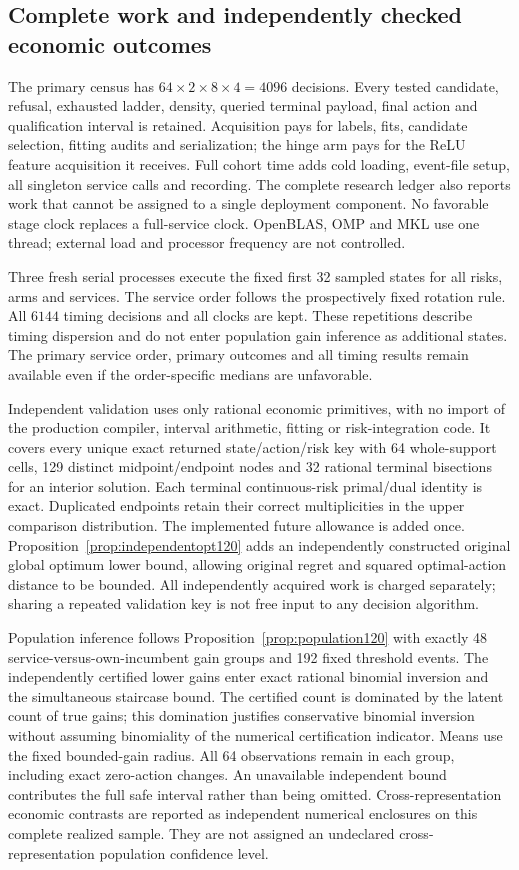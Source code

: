 \subsection{Complete work and independently checked economic outcomes}
The primary census has $64\times2\times8\times4=4096$ decisions.
Every tested candidate, refusal, exhausted ladder, density, queried terminal
payload, final action and qualification interval is retained. Acquisition pays
for labels, fits, candidate selection, fitting audits and serialization; the
hinge arm pays for the ReLU feature acquisition it receives. Full cohort time
adds cold loading, event-file setup, all singleton service calls and recording.
The complete research ledger also reports work that cannot be assigned to a
single deployment component. No favorable stage clock replaces a full-service
clock. OpenBLAS, OMP and MKL use one thread; external load and processor frequency
are not controlled.

Three fresh serial processes execute the fixed first 32 sampled states for
all risks, arms and services. The service order follows the prospectively fixed
rotation rule. All $6144$ timing decisions and all clocks are kept. These
repetitions describe timing dispersion and do not enter population gain inference
as additional states. The primary service order, primary outcomes and all timing
results remain available even if the order-specific medians are unfavorable.

Independent validation uses only rational economic primitives, with no import of
the production compiler, interval arithmetic, fitting or risk-integration code.
It covers every unique exact returned state/action/risk key with 64 whole-support
cells, 129 distinct midpoint/endpoint nodes and 32 rational terminal bisections
for an interior solution. Each terminal continuous-risk primal/dual identity is
exact. Duplicated endpoints retain their correct multiplicities in the upper
comparison distribution. The implemented future allowance is added once.
Proposition~\ref{prop:independentopt120} adds an independently constructed
original global optimum lower bound, allowing original regret and squared
optimal-action distance to be bounded. All independently acquired work is
charged separately; sharing a repeated validation key is not free input to any
decision algorithm.

Population inference follows Proposition~\ref{prop:population120} with exactly
48 service-versus-own-incumbent gain groups and 192 fixed threshold events.
The independently certified lower gains enter exact rational binomial inversion
and the simultaneous staircase bound. The certified count is dominated by the
latent count of true gains; this domination justifies conservative binomial
inversion without assuming binomiality of the numerical certification indicator.
Means use the fixed bounded-gain radius.
All 64 observations remain in each group, including exact zero-action changes.
An unavailable independent bound contributes the full safe interval rather than
being omitted. Cross-representation economic contrasts are reported as
independent numerical enclosures on this complete realized sample. They are not
assigned an undeclared cross-representation population confidence level.


